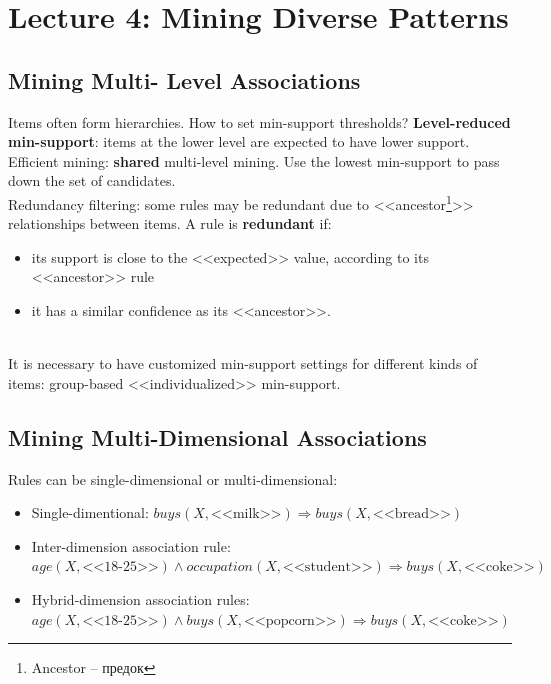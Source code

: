\section{Lecture 4: Mining Diverse Patterns}

\subsection{Mining Multi- Level Associations}

Items often form hierarchies. How to set min-support thresholds? \textbf{Level-reduced min-support}: items at the lower level are expected to have lower support.\\

Efficient mining: \textbf{shared} multi-level mining. Use the lowest min-support to pass down the set of candidates.\\

Redundancy filtering: some rules may be redundant due to <<ancestor\footnote{Ancestor -- предок}>> relationships between items. A rule is \textbf{redundant} if:
\begin{itemize}
\item its support is close to the <<expected>> value, according to its <<ancestor>> rule
\item it has a similar confidence as its <<ancestor>>.
\end{itemize}\\

It is necessary to have customized min-support settings for different kinds of items: group-based <<individualized>> min-support.

\subsection{Mining Multi-Dimensional Associations}
Rules can be single-dimensional or multi-dimensional:
\begin{itemize}
\item Single-dimentional: $buys(X, \text{<<milk>>}) \Rightarrow buys(X, \text{<<bread>>})$
\item Inter-dimension association rule: $age(X, \text{<<18-25>>}) \wedge occupation(X, \text{<<student>>}) \Rightarrow buys(X, \text{<<coke>>})$ \item Hybrid-dimension association rules: $age(X, \text{<<18-25>>}) \wedge buys(X, \text{<<popcorn>>}) \Rightarrow buys(X, \text{<<coke>>})$
\end{itemize}


